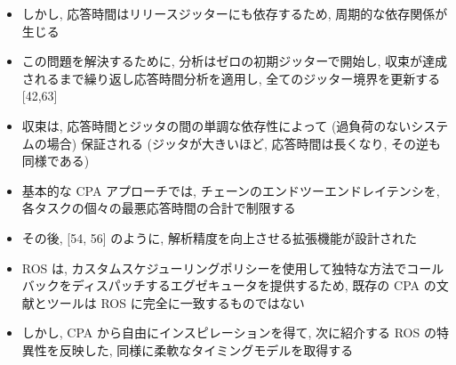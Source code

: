 {    \begin{frame}{}
        \begin{itemize}
            \item しかし, 応答時間はリリースジッターにも依存するため, 周期的な依存関係が生じる
            \item この問題を解決するために, 分析はゼロの初期ジッターで開始し, 収束が達成されるまで繰り返し応答時間分析を適用し, 全てのジッター境界を更新する [42,63]
            \item 収束は, 応答時間とジッタの間の単調な依存性によって (過負荷のないシステムの場合) 保証される (ジッタが大きいほど, 応答時間は長くなり, その逆も同様である)
            \item 基本的な CPA アプローチでは, チェーンのエンドツーエンドレイテンシを, 各タスクの個々の最悪応答時間の合計で制限する
            \item その後, [54, 56] のように, 解析精度を向上させる拡張機能が設計された
        \end{itemize}
    \end{frame}

    \begin{frame}{}
        \begin{itemize}
            \item ROS は, カスタムスケジューリングポリシーを使用して独特な方法でコールバックをディスパッチするエグゼキュータを提供するため, 既存の CPA の文献とツールは ROS に完全に一致するものではない
            \item しかし, CPA から自由にインスピレーションを得て, 次に紹介する ROS の特異性を反映した, 同様に柔軟なタイミングモデルを取得する
        \end{itemize}
    \end{frame}
}
